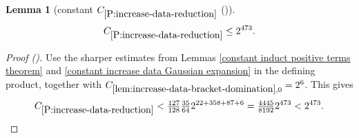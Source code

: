 \documentclass[12pt,reqno]{amsart}
\newcommand{\auto}{{({\tiny\faCar})}}
\theoremstyle{plain}
\newtheorem{lemma}[theorem]{Lemma}
\numberwithin{equation}{section}
\theoremstyle{remark}
\newcommand{\using}[1]{}
\begin{document}
\begin{lemma}[constant $C_{\ref{P:increase-data-reduction}}$ \auto]\label{constant increase data reduction}\using{constant induct positive terms theorem}\using{constant increase data Gaussian expansion}\using{lem:increase-data-bracket-domination}\using{P:increase-data-reduction}
\begin{equation}\label{constant increase data reduction bound}
C_{\ref{P:increase-data-reduction}}\le2^{473}.
\end{equation}
\end{lemma}
\begin{proof}[Proof \auto]
Use the sharper estimates from Lemmas \ref{constant induct positive terms theorem} and \ref{constant increase data Gaussian expansion} in the defining product, together with $C_{\ref{lem:increase-data-bracket-domination},0}=2^6$. This gives
\[
C_{\ref{P:increase-data-reduction}}
<\tfrac{127}{128}\tfrac{35}{64}2^{22+358+87+6}
=\tfrac{4445}{8192}2^{473}
<2^{473}.
\]
\end{proof}
\end{document}
